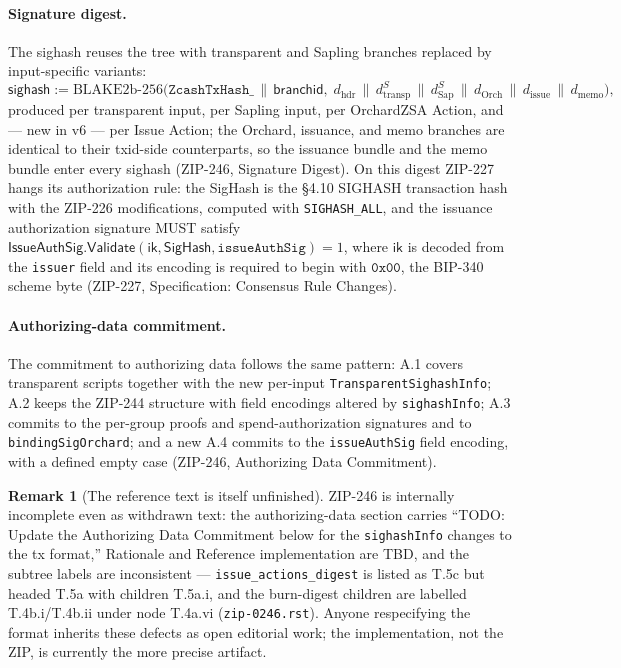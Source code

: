 \documentclass[11pt,a4paper]{article}
\theoremstyle{definition}
\newtheorem{remark}[theorem]{Remark}
\begin{document}
\paragraph{Signature digest.} The sighash reuses the tree with transparent
and Sapling branches replaced by input-specific variants:
\[
\mathsf{sighash} := \mathrm{BLAKE2b\text{-}256}\bigl(
\texttt{ZcashTxHash\_} \,\|\, \mathsf{branchid},\;
d_{\mathrm{hdr}} \,\|\, d^{S}_{\mathrm{transp}} \,\|\,
d^{S}_{\mathrm{Sap}} \,\|\, d_{\mathrm{Orch}} \,\|\, d_{\mathrm{issue}}
\,\|\, d_{\mathrm{memo}}\bigr),
\]
produced per transparent input, per Sapling input, per OrchardZSA Action,
and --- new in v6 --- per Issue Action; the Orchard, issuance, and memo
branches are identical to their txid-side counterparts, so the issuance
bundle and the memo bundle enter every sighash (ZIP-246, Signature Digest).
On this digest ZIP-227 hangs its authorization rule: the SigHash is the
\S4.10 SIGHASH transaction hash with the ZIP-226 modifications, computed
with \texttt{SIGHASH\_ALL}, and the issuance authorization signature MUST
satisfy $\mathsf{IssueAuthSig.Validate}(\mathsf{ik}, \mathsf{SigHash},
\mathtt{issueAuthSig}) = 1$, where $\mathsf{ik}$ is decoded from the
\texttt{issuer} field and its encoding is required to begin with
$\mathtt{0x00}$, the BIP-340 scheme byte (ZIP-227, Specification: Consensus
Rule Changes).

\paragraph{Authorizing-data commitment.} The commitment to authorizing data
follows the same pattern: A.1 covers transparent scripts together with the
new per-input \texttt{TransparentSighashInfo}; A.2 keeps the ZIP-244
structure with field encodings altered by \texttt{sighashInfo}; A.3 commits
to the per-group proofs and spend-authorization signatures and to
\texttt{bindingSigOrchard}; and a new A.4 commits to the
\texttt{issueAuthSig} field encoding, with a defined empty case (ZIP-246,
Authorizing Data Commitment).

\begin{remark}[The reference text is itself unfinished]
\label{rem:zsa-zip246-defects}
ZIP-246 is internally incomplete even as withdrawn text: the
authorizing-data section carries ``TODO: Update the Authorizing Data
Commitment below for the \texttt{sighashInfo} changes to the tx format,''
Rationale and Reference implementation are TBD, and the subtree labels are
inconsistent --- \texttt{issue\_actions\_digest} is listed as T.5c but headed
T.5a with children T.5a.i, and the burn-digest children are labelled
T.4b.i/T.4b.ii under node T.4a.vi (\texttt{zip-0246.rst}). Anyone
respecifying the format inherits these defects as open editorial work; the
implementation, not the ZIP, is currently the more precise artifact.
\end{remark}
\end{document}
